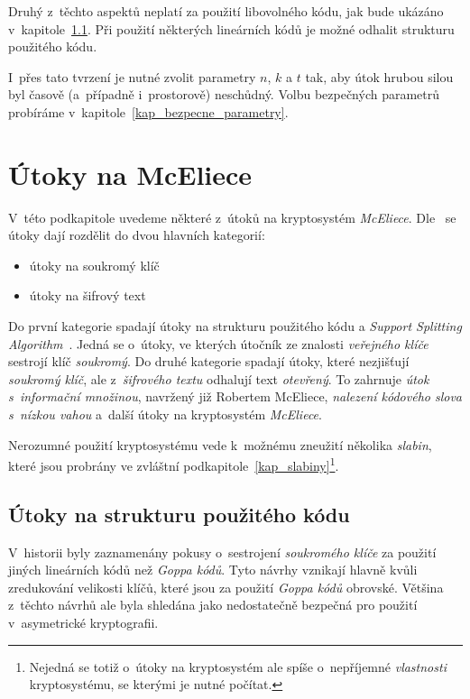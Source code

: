 \documentclass[thesis=M,czech,hidelinks]{FITthesis}[2012/06/26]
\newcommand{\0}{{\textcolor[gray]{0.75}{0}}}
\begin{document}
Druhý z~těchto aspektů neplatí za použití libovolného kódu, jak bude ukázáno
v~kapitole~\ref{kap_utoky_na_strukturu_kodu}. Při použití některých lineárních
kódů je možné odhalit strukturu použitého kódu.

I~přes tato tvrzení je nutné zvolit parametry $n$, $k$ a $t$ tak, aby útok
hrubou silou byl časově (a~případně i~prostorově) neschůdný. Volbu bezpečných
parametrů probíráme v~kapitole~\ref{kap_bezpecne_parametry}.



\section{Útoky na McEliece}

V~této podkapitole uvedeme některé z~útoků na kryptosystém \emph{McEliece}.
Dle~\cite{Engelbert} se útoky dají rozdělit do dvou hlavních kategorií:

\begin{itemize}
    \item útoky na soukromý klíč
    \item útoky na šifrový text
\end{itemize}

Do první kategorie spadají útoky na strukturu použitého kódu a \emph{Support
Splitting Algorithm}~\cite{Sendrier}. Jedná se o~útoky, ve kterých útočník ze
znalosti \emph{veřejného klíče} sestrojí klíč \emph{soukromý}. Do druhé
kategorie spadají útoky, které nezjišťují \emph{soukromý klíč}, ale
z~\emph{šifrového textu} odhalují text \emph{otevřený}. To zahrnuje \emph{útok
s~informační množinou}, navržený již Robertem McEliece, \emph{nalezení kódového
slova s~nízkou vahou} a~další útoky na kryptosystém \emph{McEliece}.

Nerozumné použití kryptosystému vede k~možnému zneužití několika \emph{slabin},
které jsou probrány ve zvláštní podkapitole~\ref{kap_slabiny}\footnote{
    Nejedná se totiž o~útoky na kryptosystém ale spíše o~nepříjemné
    \emph{vlastnosti} kryptosystému, se kterými je nutné počítat.
}.


\subsection{Útoky na strukturu použitého kódu}\label{kap_utoky_na_strukturu_kodu}

V~historii byly zaznamenány pokusy o~sestrojení \emph{soukromého klíče} za
použití jiných lineárních kódů než \emph{Goppa kódů}. Tyto návrhy vznikají
hlavně kvůli zredukování velikosti klíčů, které jsou za použití \emph{Goppa
kódů} obrovské. Většina z~těchto návrhů ale byla shledána jako nedostatečně
bezpečná pro použití v~asymetrické kryptografii.
\end{document}
